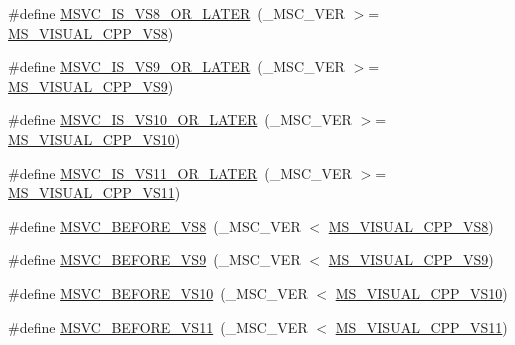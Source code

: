 \begin{DoxyCompactItemize}
\item 
\#define \hyperlink{compiler_8h_a2e30ef2059814414a404f5d2c8f468ca}{M\-S\-V\-C\-\_\-\-I\-S\-\_\-\-V\-S8\-\_\-\-O\-R\-\_\-\-L\-A\-T\-E\-R}~(\-\_\-\-M\-S\-C\-\_\-\-V\-E\-R $>$= \hyperlink{compiler_8h_a8d5296555daf8174a33c160b74544b83}{M\-S\-\_\-\-V\-I\-S\-U\-A\-L\-\_\-\-C\-P\-P\-\_\-\-V\-S8})
\item 
\#define \hyperlink{compiler_8h_a8f219e87872c2515fcad8d6439de117e}{M\-S\-V\-C\-\_\-\-I\-S\-\_\-\-V\-S9\-\_\-\-O\-R\-\_\-\-L\-A\-T\-E\-R}~(\-\_\-\-M\-S\-C\-\_\-\-V\-E\-R $>$= \hyperlink{compiler_8h_a3ab56482f6de80825bbeab1ac53c5c2b}{M\-S\-\_\-\-V\-I\-S\-U\-A\-L\-\_\-\-C\-P\-P\-\_\-\-V\-S9})
\item 
\#define \hyperlink{compiler_8h_a1eb316291d7106b16beaae116ad9c978}{M\-S\-V\-C\-\_\-\-I\-S\-\_\-\-V\-S10\-\_\-\-O\-R\-\_\-\-L\-A\-T\-E\-R}~(\-\_\-\-M\-S\-C\-\_\-\-V\-E\-R $>$= \hyperlink{compiler_8h_a963332af49ce1d9aa3728e52afb50f71}{M\-S\-\_\-\-V\-I\-S\-U\-A\-L\-\_\-\-C\-P\-P\-\_\-\-V\-S10})
\item 
\#define \hyperlink{compiler_8h_ab7edeab9cbdc5849ca685842916087e6}{M\-S\-V\-C\-\_\-\-I\-S\-\_\-\-V\-S11\-\_\-\-O\-R\-\_\-\-L\-A\-T\-E\-R}~(\-\_\-\-M\-S\-C\-\_\-\-V\-E\-R $>$= \hyperlink{compiler_8h_a24c48fd4189f4008595d93e3df426a35}{M\-S\-\_\-\-V\-I\-S\-U\-A\-L\-\_\-\-C\-P\-P\-\_\-\-V\-S11})
\item 
\#define \hyperlink{compiler_8h_a25b7f21e3200c29abbc43ea4b844906b}{M\-S\-V\-C\-\_\-\-B\-E\-F\-O\-R\-E\-\_\-\-V\-S8}~(\-\_\-\-M\-S\-C\-\_\-\-V\-E\-R $<$ \hyperlink{compiler_8h_a8d5296555daf8174a33c160b74544b83}{M\-S\-\_\-\-V\-I\-S\-U\-A\-L\-\_\-\-C\-P\-P\-\_\-\-V\-S8})
\item 
\#define \hyperlink{compiler_8h_ac252a9a5562eb12cf0afb88ede000494}{M\-S\-V\-C\-\_\-\-B\-E\-F\-O\-R\-E\-\_\-\-V\-S9}~(\-\_\-\-M\-S\-C\-\_\-\-V\-E\-R $<$ \hyperlink{compiler_8h_a3ab56482f6de80825bbeab1ac53c5c2b}{M\-S\-\_\-\-V\-I\-S\-U\-A\-L\-\_\-\-C\-P\-P\-\_\-\-V\-S9})
\item 
\#define \hyperlink{compiler_8h_a80c2d6e6796d0a40df4a06413904b0a8}{M\-S\-V\-C\-\_\-\-B\-E\-F\-O\-R\-E\-\_\-\-V\-S10}~(\-\_\-\-M\-S\-C\-\_\-\-V\-E\-R $<$ \hyperlink{compiler_8h_a963332af49ce1d9aa3728e52afb50f71}{M\-S\-\_\-\-V\-I\-S\-U\-A\-L\-\_\-\-C\-P\-P\-\_\-\-V\-S10})
\item 
\#define \hyperlink{compiler_8h_a214fa704cbedb50338403c72f3785ac1}{M\-S\-V\-C\-\_\-\-B\-E\-F\-O\-R\-E\-\_\-\-V\-S11}~(\-\_\-\-M\-S\-C\-\_\-\-V\-E\-R $<$ \hyperlink{compiler_8h_a24c48fd4189f4008595d93e3df426a35}{M\-S\-\_\-\-V\-I\-S\-U\-A\-L\-\_\-\-C\-P\-P\-\_\-\-V\-S11})

\end{DoxyCompactItemize}
